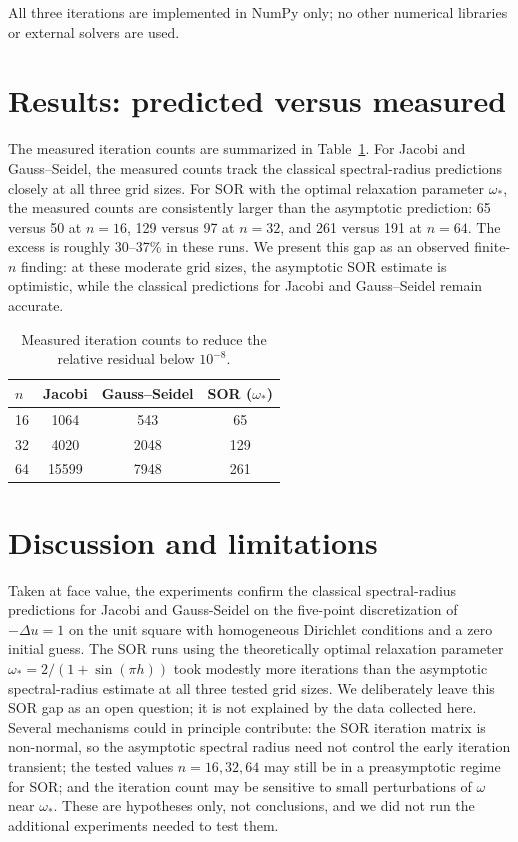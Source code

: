 \documentclass[11pt]{article}
\begin{document}
All three iterations are implemented in NumPy only; no other numerical libraries or external solvers are used.
\section{Results: predicted versus measured}
The measured iteration counts are summarized in Table~\ref{tab:measured}. For Jacobi and Gauss--Seidel, the measured counts track the classical spectral-radius predictions closely at all three grid sizes. For SOR with the optimal relaxation parameter \(\omega_*\), the measured counts are consistently larger than the asymptotic prediction: 65 versus 50 at \(n=16\), 129 versus 97 at \(n=32\), and 261 versus 191 at \(n=64\). The excess is roughly 30--37\% in these runs. We present this gap as an observed finite-\(n\) finding: at these moderate grid sizes, the asymptotic SOR estimate is optimistic, while the classical predictions for Jacobi and Gauss--Seidel remain accurate.

\begin{table}[h]
\centering
\begin{tabular}{lccc}
\toprule
\(n\) & Jacobi & Gauss--Seidel & SOR (\(\omega_*\)) \\
\midrule
16 & 1064 & 543 & 65 \\
32 & 4020 & 2048 & 129 \\
64 & 15599 & 7948 & 261 \\
\bottomrule
\end{tabular}
\caption{Measured iteration counts to reduce the relative residual below \(10^{-8}\).}
\label{tab:measured}
\end{table}
\section{Discussion and limitations}
Taken at face value, the experiments confirm the classical spectral-radius predictions for Jacobi and Gauss-Seidel on the five-point discretization of \(-\Delta u=1\) on the unit square with homogeneous Dirichlet conditions and a zero initial guess. The SOR runs using the theoretically optimal relaxation parameter \(\omega_* = 2/(1+\sin(\pi h))\) took modestly more iterations than the asymptotic spectral-radius estimate at all three tested grid sizes. We deliberately leave this SOR gap as an open question; it is not explained by the data collected here. Several mechanisms could in principle contribute: the SOR iteration matrix is non-normal, so the asymptotic spectral radius need not control the early iteration transient; the tested values \(n=16,32,64\) may still be in a preasymptotic regime for SOR; and the iteration count may be sensitive to small perturbations of \(\omega\) near \(\omega_*\). These are hypotheses only, not conclusions, and we did not run the additional experiments needed to test them.
\end{document}
